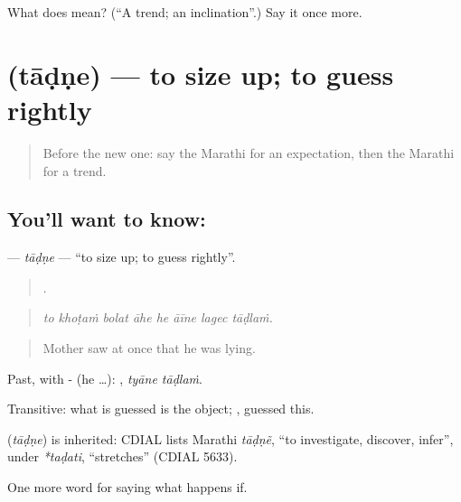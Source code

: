 \begin{tcolorbox}[breakable,colback=teal!4,colframe=teal!35!black,title={Before you move on}]
What does  mean? (\textquotedblleft{}A trend; an inclination\textquotedblright{}.) Say it once more.
\end{tcolorbox}
\section[\texorpdfstring{\mr{ताडणे} (tāḍṇe)}{ताडणे (tāḍṇe)}]{ (tāḍṇe) — to size up; to guess rightly}

\label{lesson:MR-C383-tadne}



\begin{quote}
Before the new one: say the Marathi for an expectation, then the Marathi for a trend.
\end{quote}

\subsection*{You'll want to know: }
\textbf{} — \emph{tāḍṇe} — \textquotedblleft{}to size up; to guess rightly\textquotedblright{}.

\begin{quote}
       .
\end{quote}

\begin{quote}
\emph{to khoṭaṁ bolat āhe he āīne lagec tāḍlaṁ.}
\end{quote}

\begin{quote}
Mother saw at once that he was lying.
\end{quote}

Past, with - (he …):  , \emph{tyāne tāḍlaṁ}.

Transitive: what is guessed is the object;  , guessed this.

\begin{cousinweb}
\textbf{} (\emph{tāḍṇe}) is inherited: CDIAL lists Marathi \emph{tāḍṇẽ}, \textquotedblleft{}to investigate, discover, infer\textquotedblright{}, under \emph{*taḍati}, \textquotedblleft{}stretches\textquotedblright{} (CDIAL 5633).
\end{cousinweb}

\begin{grammarlens}[title={What you've built}]
One more word for saying what happens if.
\end{grammarlens}

